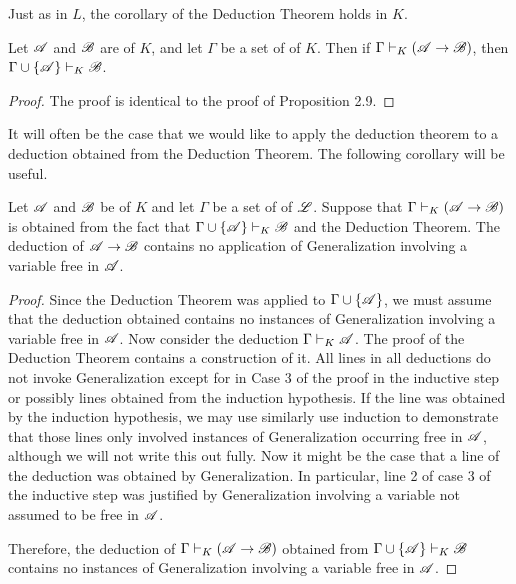 Just as in \(L\), the corollary of the Deduction Theorem holds in \(K\).

\begin{proposition}
  Let \(\mathscr{A}\) and \(\mathscr{B}\) are \wfs{} of \(K\), and let \(\Gamma\) be a set of \wfs{} of \(K\). Then if \(\Gamma \vdash_{K} (\mathscr{A} \rightarrow \mathscr{B})\), then \(\Gamma \cup \{\mathscr{A}\} \vdash_{K} \mathscr{B}\).

  \begin{proof}
    The proof is identical to the proof of Proposition 2.9.
  \end{proof}
\end{proposition}

It will often be the case that we would like to apply the deduction theorem to a deduction obtained from the Deduction Theorem. The following corollary will be useful.

\begin{corollary*}
  Let \(\mathscr{A}\) and \(\mathscr{B}\) be \wfs{} of \(K\) and let \(\Gamma\) be a set of \wfs{} of \(\mathscr{L}\). Suppose that \(\Gamma \vdash_{K} (\mathscr{A} \rightarrow \mathscr{B})\) is obtained from the fact that \(\Gamma \cup \{\mathscr{A}\} \vdash_{K} \mathscr{B}\) and the Deduction Theorem. The deduction of \(\mathscr{A} \rightarrow \mathscr{B}\) contains no application of Generalization involving a variable free in \(\mathscr{A}\).

  \begin{proof}
    Since the Deduction Theorem was applied to \(\Gamma \cup \{\mathscr{A}\}\), we must assume that the deduction obtained contains no instances of Generalization involving a variable free in \(\mathscr{A}\). Now consider the deduction \(\Gamma \vdash_{K} \mathscr{A}\). The proof of the Deduction Theorem contains a construction of it. All lines in all deductions do not invoke Generalization except for in Case 3 of the proof in the inductive step or possibly lines obtained from the induction hypothesis. If the line was obtained by the induction hypothesis, we may use similarly use induction to demonstrate that those lines only involved instances of Generalization occurring free in \(\mathscr{A}\), although we will not write this out fully. Now it might be the case that a line of the deduction was obtained by Generalization. In particular, line 2 of case 3 of the inductive step was justified by Generalization involving a variable not assumed to be free in \(\mathscr{A}\).

    Therefore, the deduction of \(\Gamma \vdash_{K} (\mathscr{A} \rightarrow \mathscr{B})\) obtained from \(\Gamma \cup \{\mathscr{A}\} \vdash_{K} \mathscr{B}\) contains no instances of Generalization involving a variable free in \(\mathscr{A}\).
  \end{proof}
\end{corollary*}


